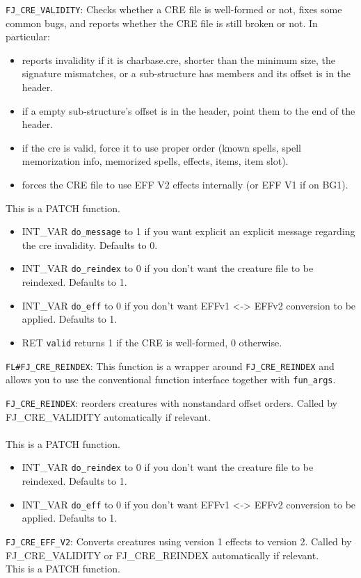 \documentclass{article}
\def\ttref#1{\ahrefloc{#1}{\tt #1}}
\begin{document}
\verb+FJ_CRE_VALIDITY+: Checks whether a CRE file is well-formed or not, fixes some common bugs, and reports whether the CRE file is still broken or not. In particular:
\begin{itemize}
\item reports invalidity if it is charbase.cre, shorter than the minimum size, the signature mismatches, or a sub-structure has members and its offset is in the header.
\item if a empty sub-structure's offset is in the header, point them to the end of the header.
\item if the cre is valid, force it to use proper order (known spells, spell memorization info, memorized spells, effects, items, item slot).
\item forces the CRE file to use EFF V2 effects internally (or EFF V1 if on BG1).
\end{itemize}
This is a PATCH function.
\begin{itemize}
\item INT_VAR \verb+do_message+ to 1 if you want explicit an explicit message regarding the cre invalidity. Defaults to 0.
\item INT_VAR \verb+do_reindex+ to 0 if you don't want the creature file to be reindexed. Defaults to 1.
\item INT_VAR \verb+do_eff+ to 0 if you don't want EFFv1 <-> EFFv2 conversion to be applied. Defaults to 1.
\item RET \verb+valid+ returns 1 if the CRE is well-formed, 0 otherwise.
\end{itemize}

\verb+FL#FJ_CRE_REINDEX+: This function is a wrapper around
\verb+FJ_CRE_REINDEX+ and allows you to use the conventional function
interface together with \ttref{MODDER} \verb+fun_args+.

\verb+FJ_CRE_REINDEX+: reorders creatures with nonstandard offset
orders. Called by FJ_CRE_VALIDITY automatically if relevant.\\\\
This is a PATCH function.
\begin{itemize}
\item INT_VAR \verb+do_reindex+ to 0 if you don't want the creature file to be reindexed. Defaults to 1.
\item INT_VAR \verb+do_eff+ to 0 if you don't want EFFv1 <-> EFFv2 conversion to be applied. Defaults to 1.
\end{itemize}

\verb+FJ_CRE_EFF_V2+: Converts creatures using version 1 effects to
version 2. Called by FJ_CRE_VALIDITY or FJ_CRE_REINDEX automatically
if relevant.\\
This is a PATCH function.
\end{document}
